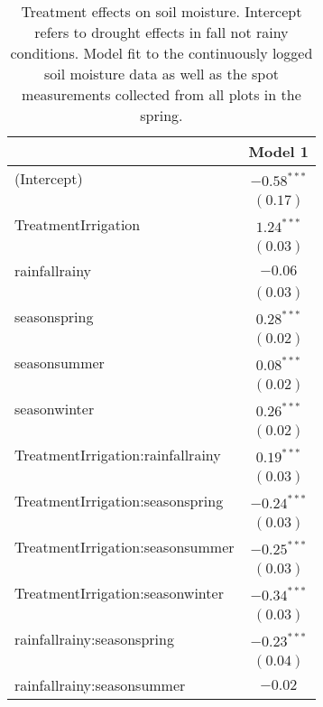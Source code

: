 
\begin{table}
\caption{Treatment effects on soil moisture. Intercept refers to drought effects in fall not rainy conditions.  Model fit to the continuously logged soil moisture data as well as the spot measurements collected from all plots in the spring.}
\begin{center}
\begin{tabular}{l c }
\hline
 & Model 1 \\
\hline
(Intercept)                       & $-0.58^{***}$ \\
                                  & $(0.17)$      \\
TreatmentIrrigation               & $1.24^{***}$  \\
                                  & $(0.03)$      \\
rainfallrainy                     & $-0.06$       \\
                                  & $(0.03)$      \\
seasonspring                      & $0.28^{***}$  \\
                                  & $(0.02)$      \\
seasonsummer                      & $0.08^{***}$  \\
                                  & $(0.02)$      \\
seasonwinter                      & $0.26^{***}$  \\
                                  & $(0.02)$      \\
TreatmentIrrigation:rainfallrainy & $0.19^{***}$  \\
                                  & $(0.03)$      \\
TreatmentIrrigation:seasonspring  & $-0.24^{***}$ \\
                                  & $(0.03)$      \\
TreatmentIrrigation:seasonsummer  & $-0.25^{***}$ \\
                                  & $(0.03)$      \\
TreatmentIrrigation:seasonwinter  & $-0.34^{***}$ \\
                                  & $(0.03)$      \\
rainfallrainy:seasonspring        & $-0.23^{***}$ \\
                                  & $(0.04)$      \\
rainfallrainy:seasonsummer        & $-0.02$       \\

\end{tabular}
\end{center}
\end{table}
